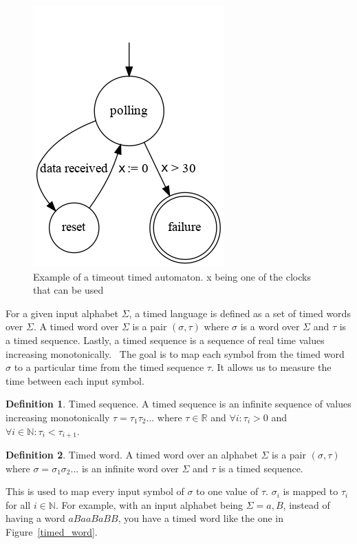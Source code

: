\documentclass[12pt]{article}
\theoremstyle{definition}
\newtheorem{definition}{Definition}[section]
\theoremstyle{definition}
\theoremstyle{remark}
\newcommand{\R}{\mathbb{R}}
\begin{document}
\begin{figure}[H]
    \centering
    \includegraphics[scale=2.5]{timed_automata.png}
    \caption{Example of a timeout timed automaton. x being one of the clocks that can be used}
    \label{timed_automata_e1}
\end{figure}

For a given input alphabet $\Sigma$, a timed language is defined as a set of timed words over $\Sigma$. A timed word over $\Sigma$ is a pair $(\sigma, \tau)$ where $\sigma$ is a word over $\Sigma$ and $\tau$ is a timed sequence. Lastly, a timed sequence is a sequence of real time values increasing monotonically.~\cite{ALUR1994183} The goal is to map each symbol from the timed word $\sigma$ to a particular time from the timed sequence $\tau$. It allows us to measure the time between each input symbol.

\theoremstyle{definition}
\begin{definition}{Timed sequence.}
A timed sequence is an infinite sequence of values increasing monotonically $\tau = \tau_1 \tau_2 ...$ where $\tau \in \R$ and $\forall i : \tau_i > 0$ and $\forall i \in \mathbb{N}: \tau_i < \tau_{i+1}$.
\end{definition}

\theoremstyle{definition}
\begin{definition}{Timed word.}
A timed word over an alphabet $\Sigma$ is a pair $(\sigma, \tau)$ where $\sigma = \sigma_1 \sigma_2 ...$ is an infinite word over $\Sigma$ and $\tau$ is a timed sequence.
\end{definition}

This is used to map every input symbol of $\sigma$ to one value of $\tau$. $\sigma_i$ is mapped to $\tau_i$ for all $i \in \mathbb{N}$. For example, with an input alphabet being $\Sigma = {a, B}$, instead of having a word $aBaaBaBB$, you have a timed word like the one in Figure~\ref{timed_word}.
\end{document}
